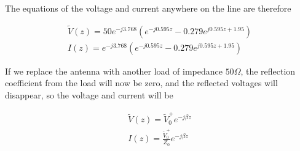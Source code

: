 \documentclass{ximera}
\begin{document}
\begin{example}
\begin{explanation}
The equations of the voltage and current anywhere on the line are therefore

\begin{eqnarray}
\tilde{V}(z)= 50  e^{-j3.768} (e^{-j 0.595 z} - 0.279  e^{j 0.595 z + 1.95}  ) \\
I(z)=   e^{-j3.768}   (e^{-j 0.595 z} - 0.279  e^{j 0.595 z+ 1.95}  ) 
\end{eqnarray}

If we replace the antenna with another load of impedance $50\Omega$, the reflection coefficient from the load will now be zero, and the reflected voltages will disappear, so the voltage and current will be 


\begin{eqnarray}
\tilde{V}(z)= \tilde{V}_0^+ e^{-j \beta z}   \\
I(z)=   \frac{\tilde{V}_0^+}{Z_0}  e^{-j \beta z} 
\end{eqnarray}


\end{explanation}




\end{example}
\end{document}
